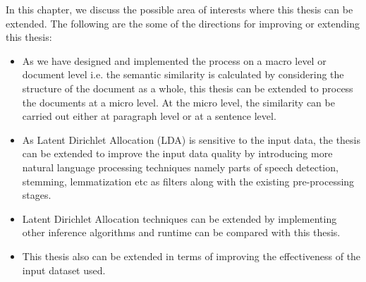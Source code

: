 \label{futurework}

In this chapter, we discuss the possible area of interests where this thesis can be extended. The following are the some of the directions for improving or extending this thesis:



\begin{itemize}
\item As we have designed and implemented the process on a macro level or document level i.e. the semantic similarity is calculated by considering the structure of the document as a whole, this thesis can be extended to process the documents at a micro level. At the micro level, the similarity can be carried out either at paragraph level or at a sentence level.

\item As Latent Dirichlet Allocation (LDA) is sensitive to the input data, the thesis can be extended to improve the input data quality by introducing more natural language processing techniques namely parts of speech detection, stemming, lemmatization etc as filters along with the existing pre-processing stages.

\item Latent Dirichlet Allocation techniques can be extended by implementing other inference algorithms and runtime can be compared with this thesis.

\item This thesis also can be extended in terms of improving the effectiveness of the input dataset used.
\end{itemize}


